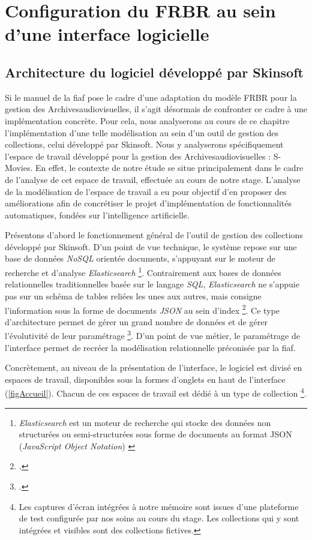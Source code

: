 \section{\label{I_2_A} Configuration du \gls{FRBR} au sein d'une interface logicielle}

\subsection{Architecture du logiciel développé par Skinsoft}

Si le manuel de la \gls{fiaf} pose le cadre d’une adaptation du modèle \gls{FRBR} pour la gestion des \gls{Archivesaudiovisuelles}, il s'agit désormais de confronter ce cadre à une implémentation concrète. Pour cela, nous analyserons au cours de ce chapitre l’implémentation d’une telle modélisation au sein d’un outil de gestion des collections, celui développé par Skinsoft. Nous y analyserons spécifiquement l’espace de travail développé pour la gestion des \gls{Archivesaudiovisuelles} : S-Movies. En effet, le contexte de notre étude se situe principalement dans le cadre de l’analyse de cet espace de travail, effectuée au cours de notre stage. L'analyse de la modélisation de l'espace de travail a eu pour objectif d'en proposer des améliorations afin de concrétiser le projet d'implémentation de fonctionnalités automatiques, fondées sur l’intelligence artificielle.  

Présentons d’abord le fonctionnement général de l’outil de gestion des collections développé par Skinsoft. D'un point de vue technique, le système repose sur une base de données \textit{NoSQL} orientée documents, s'appuyant sur le moteur de recherche et d'analyse \textit{Elasticsearch} \footnote{\textit{Elasticsearch} est un moteur de recherche qui stocke des données non structurées ou semi-structurées sous forme de documents au format JSON (\textit{JavaScript Object Notation}) \cite{zotero-item-821}}. Contrairement aux bases de données relationnelles traditionnelles basée sur le langage \textit{SQL}, \textit{Elasticsearch} ne s'appuie pas sur un schéma de tables reliées les unes aux autres, mais consigne l'information sous la forme de documents \textit{JSON} au sein d'index \footcite{2025c}. Ce type d'architecture permet de gérer un grand nombre de données et de gérer l'évolutivité de leur paramétrage \footcite{2025c}. D'un point de vue métier, le paramétrage de l'interface permet de recréer la modélisation relationnelle préconisée par la \gls{fiaf}.

Concrètement, au niveau de la présentation de l'interface, le logiciel est divisé en espaces de travail, disponibles sous la formes d'onglets en haut de l'interface (\cref{figAccueil}). Chacun de ces espaces de travail est dédié à un type de collection \footnote{Les captures d'écran intégrées à notre mémoire sont issues d'une plateforme de test configurée par nos soins au cours du stage. Les collections qui y sont intégrées et visibles sont des collections fictives.}. 


